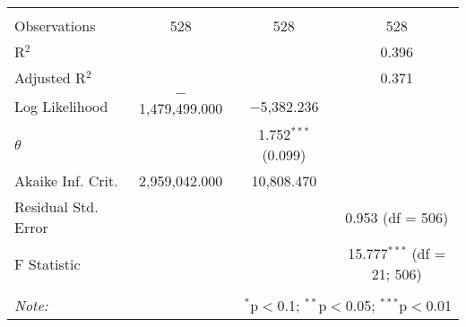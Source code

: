 \begin{table}[!htbp]
\begin{tabular}{@{\extracolsep{5pt}}lccc}
 \hline \\[-1.8ex] 
Observations & 528 & 528 & 528 \\ 
R$^{2}$ &  &  & 0.396 \\ 
Adjusted R$^{2}$ &  &  & 0.371 \\ 
Log Likelihood & $-$1,479,499.000 & $-$5,382.236 &  \\ 
$\theta$ &  & 1.752$^{***}$  (0.099) &  \\ 
Akaike Inf. Crit. & 2,959,042.000 & 10,808.470 &  \\ 
Residual Std. Error &  &  & 0.953 (df = 506) \\ 
F Statistic &  &  & 15.777$^{***}$ (df = 21; 506) \\ 
\hline 
\hline \\[-1.8ex] 
\textit{Note:}  & \multicolumn{3}{r}{$^{*}$p$<$0.1; $^{**}$p$<$0.05; $^{***}$p$<$0.01} \\ 
\end{tabular} 
\end{table} 
